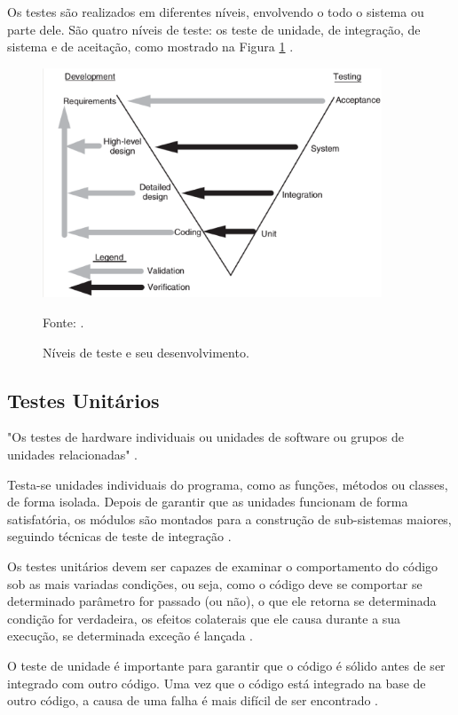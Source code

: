 Os testes são realizados em diferentes níveis, envolvendo o todo o sistema ou parte dele. São quatro níveis de teste: os teste de unidade, de integração, de sistema e de aceitação, como mostrado na Figura \ref{nivelTeste} \cite[pág.~18]{naik2008}.

\begin{figure}[H]
\centering
\includegraphics[width=0.9\textwidth]{figuras/nivelTeste}
\caption{Níveis de teste e seu desenvolvimento.}{Fonte: .} 
\label{nivelTeste}
\end{figure}

\subsection{Testes Unitários}

"Os testes de hardware individuais ou unidades de software ou grupos de unidades relacionadas" \cite{ieee}.

Testa-se unidades individuais do programa, como as funções, métodos ou classes, de forma isolada. Depois de garantir que as unidades funcionam de forma satisfatória, os módulos são montados para a construção de sub-sistemas maiores, seguindo técnicas de teste de integração \cite[pág.~18]{naik2008}.

Os testes unitários devem ser capazes de examinar o comportamento do código sob as mais variadas condições, ou seja, como o código deve se comportar se determinado parâmetro for passado (ou não), o que ele retorna se determinada condição for verdadeira, os efeitos colaterais que ele causa durante a sua execução, se determinada exceção é lançada \cite{thiago2001}.

O teste de unidade é importante para garantir que o código é sólido antes de ser integrado com outro código. Uma vez que o código está integrado na base de outro código, a causa de uma falha é mais difícil de ser encontrado \cite{williams2006}.

